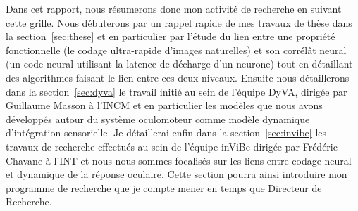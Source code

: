 \documentclass[11pt,french,a4paper,oneside]{article}%
\begin{document}
Dans cet rapport, nous résumerons donc mon activité de recherche en suivant cette grille. Nous débuterons par un rappel rapide de mes travaux de thèse dans la section~\ref{sec:these} et en particulier par l'étude du lien entre une propriété fonctionnelle (le codage ultra-rapide d'images naturelles) et son corrélât neural (un code neural utilisant la latence de décharge d'un neurone) tout en détaillant des algorithmes faisant le lien entre ces deux niveaux. Ensuite nous détaillerons dans la section~\ref{sec:dyva} le travail initié au sein de l'équipe {\sc DyVA}, dirigée par Guillaume Masson à l'INCM et en particulier les modèles que nous avons développés autour du système oculomoteur comme modèle dynamique d'intégration sensorielle. Je détaillerai enfin dans la section~\ref{sec:invibe} les travaux de recherche effectués au sein de l'équipe {\sc inViBe} dirigée par Frédéric Chavane à l'INT et nous nous sommes focalisés sur les liens entre codage neural et dynamique de la réponse oculaire. %
Cette section pourra ainsi introduire mon programme de recherche que je compte mener en temps que Directeur de Recherche.
\end{document}
